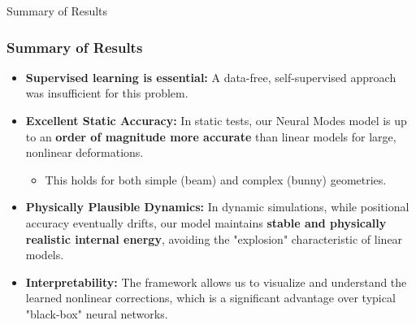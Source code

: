\documentclass{beamer}
\begin{document}
\begin{frame}{Summary of Results}
    \frametitle{Summary of Results}
    
    \begin{itemize}
        \item \textbf{Supervised learning is essential:} A data-free, self-supervised approach was insufficient for this problem.
        \vspace{1.5em}
        
        \item \textbf{Excellent Static Accuracy:} In static tests, our Neural Modes model is up to an \textbf{order of magnitude more accurate} than linear models for large, nonlinear deformations.
        \begin{itemize}
            \item This holds for both simple (beam) and complex (bunny) geometries.
        \end{itemize}
        \vspace{1.5em}
        
        \item \textbf{Physically Plausible Dynamics:} In dynamic simulations, while positional accuracy eventually drifts, our model maintains \textbf{stable and physically realistic internal energy}, avoiding the "explosion" characteristic of linear models.
        \vspace{1.5em}
        
        \item \textbf{Interpretability:} The framework allows us to visualize and understand the learned nonlinear corrections, which is a significant advantage over typical "black-box" neural networks.
    \end{itemize}
\end{frame}
\end{document}
